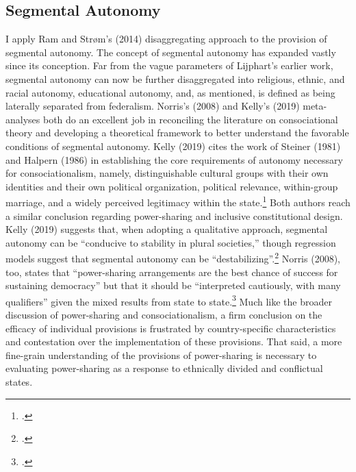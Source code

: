 \documentclass[12pt]{article}
\begin{document}
\subsection{Segmental Autonomy}
I apply Ram and Strøm's (2014) disaggregating approach to the provision of segmental autonomy. The concept of segmental autonomy has expanded vastly since its conception. Far from the vague parameters of Lijphart’s earlier work, segmental autonomy can now be further disaggregated into religious, ethnic, and racial autonomy, educational autonomy, and, as mentioned, is defined as being laterally separated from federalism. Norris’s (2008) and Kelly’s (2019) meta-analyses both do an excellent job in reconciling the literature on consociational theory and developing a theoretical framework to better understand the favorable conditions of segmental autonomy. Kelly (2019) cites the work of Steiner (1981) and Halpern (1986) in establishing the core requirements of autonomy necessary for consociationalism, namely, distinguishable cultural groups with their own identities and their own political organization, political relevance, within-group marriage, and a widely perceived legitimacy within the state.\footcite[30]{kelly_power-sharing_2019, steiner_research_1981, halpern_disorderly_1986} Both authors reach a similar conclusion regarding power-sharing and inclusive constitutional design. Kelly (2019) suggests that, when adopting a qualitative approach, segmental autonomy can be ``conducive to stability in plural societies,'' though regression models suggest that segmental autonomy can be ``destabilizing''.\footcite[3]{kelly_power-sharing_2019} Norris (2008), too, states that ``power-sharing arrangements are the best chance of success for sustaining democracy'' but that it should be ``interpreted cautiously, with many qualifiers'' given the mixed results from state to state.\footcite[222]{norris_what_2008} Much like the broader discussion of power-sharing and consociationalism, a firm conclusion on the efficacy of individual provisions is frustrated by country-specific characteristics and contestation over the implementation of these provisions. That said, a more fine-grain understanding of the provisions of power-sharing is necessary to evaluating power-sharing as a response to ethnically divided and conflictual states.
\end{document}
